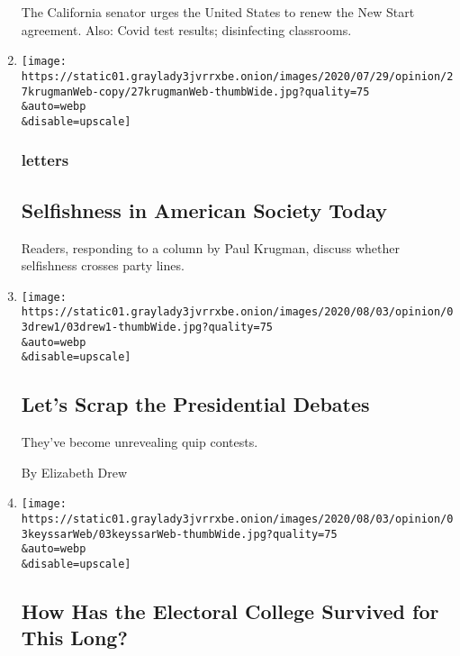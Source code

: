 \begin{enumerate}
  The California senator urges the United States to renew the New Start
  agreement. Also: Covid test results; disinfecting classrooms.
\item
  \href{/2020/08/03/opinion/letters/selfishness-society.html}{}

  \texttt{[image: https://static01.graylady3jvrrxbe.onion/images/2020/07/29/opinion/27krugmanWeb-copy/27krugmanWeb-thumbWide.jpg?quality=75\\\&auto=webp\\\&disable=upscale]}

  \hypertarget{letters-1}{%
  \subsubsection{letters}\label{letters-1}}

  \hypertarget{selfishness-in-american-society-today}{%
  \subsection{Selfishness in American Society
  Today}\label{selfishness-in-american-society-today}}

  Readers, responding to a column by Paul Krugman, discuss whether
  selfishness crosses party lines.
\item
  \href{/2020/08/03/opinion/trump-biden-presidential-debates-2020.html}{}

  \texttt{[image: https://static01.graylady3jvrrxbe.onion/images/2020/08/03/opinion/03drew1/03drew1-thumbWide.jpg?quality=75\\\&auto=webp\\\&disable=upscale]}

  \hypertarget{lets-scrap-the-presidential-debates}{%
  \subsection{Let's Scrap the Presidential
  Debates}\label{lets-scrap-the-presidential-debates}}

  They've become unrevealing quip contests.

  By Elizabeth Drew
\item
  \href{/2020/08/03/opinion/electoral-college-racism-white-supremacy.html}{}

  \texttt{[image: https://static01.graylady3jvrrxbe.onion/images/2020/08/03/opinion/03keyssarWeb/03keyssarWeb-thumbWide.jpg?quality=75\\\&auto=webp\\\&disable=upscale]}

  \hypertarget{how-has-the-electoral-college-survived-for-this-long}{%
  \subsection{How Has the Electoral College Survived for This
  Long?}\label{how-has-the-electoral-college-survived-for-this-long}}


\end{enumerate}
